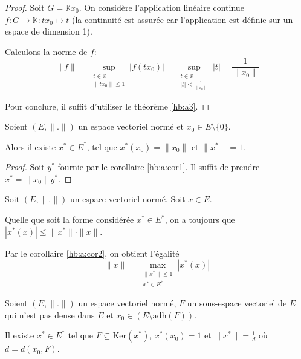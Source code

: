 \begin{proof}
  Soit $G = \mathbb{K}x_0$. On considère l'application
  linéaire continue $f: G\to\mathbb{K}:tx_0\mapsto t$
  (la continuité est assurée car l'application est
  définie sur un espace de dimension 1).

  Calculons la norme de $f$:
  $$\|f\|=\sup_{\substack{t\in\mathbb{K}\\ \|tx_0\|\leq 1}}|f(tx_0)|=
  \sup_{\substack{t\in\mathbb{K}\\ |t|\leq\frac{1}{\|x_0\|}}}|t| =
  \frac{1}{\|x_0\|}$$

  Pour conclure, il suffit d'utiliser le théorème \ref{hb:a3}.
\end{proof}

\begin{cor}\label{hb:a:cor2}
  Soient $(E, \|.\|)$ un espace vectoriel normé et
  $x_0\in E\setminus\{0\}$.

  Alors il existe $x^*\in E^*$, tel que $x^*(x_0)=\|x_0\|$
  et $\|x^*\|= 1$.
\end{cor}
\begin{proof}
  Soit $y^*$ fournie par le corollaire \ref{hb:a:cor1}.
  Il suffit de prendre $x^*= \|x_0\|y^*$.
\end{proof}

\begin{rem}
  Soit $(E, \|.\|)$ un espace vectoriel normé. Soit $x\in E$.

  Quelle que soit la forme considérée $x^*\in E^*$, on a toujours
  que $|x^*(x)|\leq \|x^*\|\cdot \|x\|$.

  Par le corollaire \ref{hb:a:cor2}, on obtient l'égalité
  $$\|x\|=\max_{\substack{\|x^*\|\leq 1 \\ x^*\in E^*}}|x^*(x)|$$
\end{rem}

\begin{cor}\label{hb:a:cor4}
  Soient $(E, \|.\|)$ un espace vectoriel normé, $F$
  un sous-espace vectoriel de $E$ qui n'est pas
  dense dans $E$ et $x_0\in (E\setminus\mathrm{adh}(F))$.

  Il existe $x^*\in E^*$ tel que $F\subseteq \mathrm{Ker}(x^*)$,
  $x^*(x_0)=1$ et $\|x^*\|=\frac{1}{d}$ où $d = d(x_0, F)$.
\end{cor}

